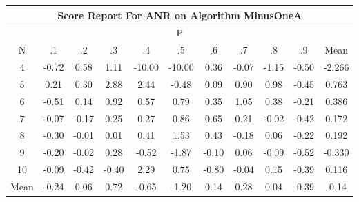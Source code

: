 \documentclass[11pt,a4paper]{report}
\begin{document}
\begin{longtable}{ | c || c | c | c | c | c | c | c | c | c || c |}
\hline
\multicolumn{11}{|c|}{ Score Report For ANR on Algorithm MinusOneA} \\
\hline
\multicolumn{11}{|c|}{ P } \\
\hline
N & .1 & .2 & .3 & .4 & .5 & .6 & .7 & .8 & .9 & Mean\\
 \hline
 \hline
 \endhead
  4 &  \cellcolor[HTML]{FFEFEF} -0.72 &  \cellcolor[HTML]{EFEFFF} 0.58 &  \cellcolor[HTML]{E7E7FF} 1.11 &  \cellcolor[HTML]{FF0000} -10.00 &  \cellcolor[HTML]{FF0000} -10.00 &  \cellcolor[HTML]{F7F7FF} 0.36 &  \cellcolor[HTML]{FFFFFF} -0.07 &  \cellcolor[HTML]{FFDFDF} -1.15 &  \cellcolor[HTML]{FFEFEF} -0.50 & -2.266 \\
  5 &  \cellcolor[HTML]{F7F7FF} 0.21 &  \cellcolor[HTML]{F7F7FF} 0.30 &  \cellcolor[HTML]{B7B7FF} 2.88 &  \cellcolor[HTML]{BFBFFF} 2.44 &  \cellcolor[HTML]{FFEFEF} -0.48 &  \cellcolor[HTML]{FFFFFF} 0.09 &  \cellcolor[HTML]{E7E7FF} 0.90 &  \cellcolor[HTML]{E7E7FF} 0.98 &  \cellcolor[HTML]{FFF7F7} -0.45 & 0.763 \\
  6 &  \cellcolor[HTML]{FFEFEF} -0.51 &  \cellcolor[HTML]{FFFFFF} 0.14 &  \cellcolor[HTML]{E7E7FF} 0.92 &  \cellcolor[HTML]{EFEFFF} 0.57 &  \cellcolor[HTML]{E7E7FF} 0.79 &  \cellcolor[HTML]{F7F7FF} 0.35 &  \cellcolor[HTML]{E7E7FF} 1.05 &  \cellcolor[HTML]{F7F7FF} 0.38 &  \cellcolor[HTML]{FFF7F7} -0.21 & 0.386 \\
  7 &  \cellcolor[HTML]{FFFFFF} -0.07 &  \cellcolor[HTML]{FFF7F7} -0.17 &  \cellcolor[HTML]{F7F7FF} 0.25 &  \cellcolor[HTML]{F7F7FF} 0.27 &  \cellcolor[HTML]{E7E7FF} 0.86 &  \cellcolor[HTML]{EFEFFF} 0.65 &  \cellcolor[HTML]{F7F7FF} 0.21 &  \cellcolor[HTML]{FFFFFF} -0.02 &  \cellcolor[HTML]{FFF7F7} -0.42 & 0.172 \\
  8 &  \cellcolor[HTML]{FFF7F7} -0.30 &  \cellcolor[HTML]{FFFFFF} -0.01 &  \cellcolor[HTML]{FFFFFF} 0.01 &  \cellcolor[HTML]{F7F7FF} 0.41 &  \cellcolor[HTML]{D7D7FF} 1.53 &  \cellcolor[HTML]{F7F7FF} 0.43 &  \cellcolor[HTML]{FFF7F7} -0.18 &  \cellcolor[HTML]{FFFFFF} 0.06 &  \cellcolor[HTML]{FFF7F7} -0.22 & 0.192 \\
  9 &  \cellcolor[HTML]{FFF7F7} -0.20 &  \cellcolor[HTML]{FFFFFF} -0.02 &  \cellcolor[HTML]{F7F7FF} 0.28 &  \cellcolor[HTML]{FFEFEF} -0.52 &  \cellcolor[HTML]{FFCFCF} -1.87 &  \cellcolor[HTML]{FFFFFF} -0.10 &  \cellcolor[HTML]{FFFFFF} 0.06 &  \cellcolor[HTML]{FFFFFF} -0.09 &  \cellcolor[HTML]{FFEFEF} -0.52 & -0.330 \\
  10 &  \cellcolor[HTML]{FFFFFF} -0.09 &  \cellcolor[HTML]{FFF7F7} -0.42 &  \cellcolor[HTML]{FFF7F7} -0.40 &  \cellcolor[HTML]{C7C7FF} 2.29 &  \cellcolor[HTML]{EFEFFF} 0.75 &  \cellcolor[HTML]{FFE7E7} -0.80 &  \cellcolor[HTML]{FFFFFF} -0.04 &  \cellcolor[HTML]{FFFFFF} 0.15 &  \cellcolor[HTML]{FFF7F7} -0.39 & 0.116 \\
 \hline
 \hline
Mean &  \cellcolor[HTML]{FFF7F7} -0.24 &  \cellcolor[HTML]{FFFFFF} 0.06 &  \cellcolor[HTML]{EFEFFF} 0.72 &  \cellcolor[HTML]{FFEFEF} -0.65 &  \cellcolor[HTML]{FFDFDF} -1.20 &  \cellcolor[HTML]{FFFFFF} 0.14 &  \cellcolor[HTML]{F7F7FF} 0.28 &  \cellcolor[HTML]{FFFFFF} 0.04 &  \cellcolor[HTML]{FFF7F7} -0.39 &  \cellcolor[HTML]{FFFFFF} -0.14
\end{longtable}
\end{document}
